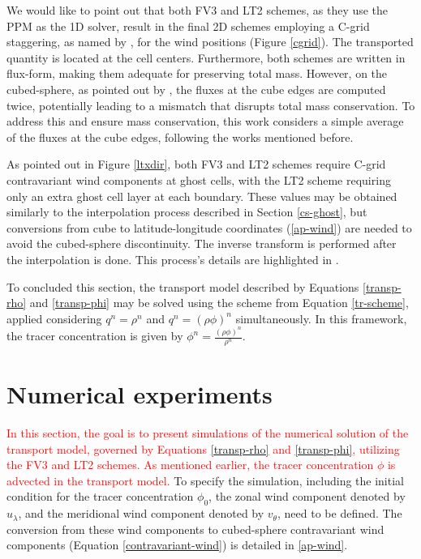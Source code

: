\documentclass[preprint,12pt]{elsarticle}
\begin{document}
\begin{linenumbers}
We would like to point out that both FV3 and LT2 schemes, as they use the PPM as the 1D solver, result in the final 2D schemes employing a C-grid staggering, as named by \cite{arakawa:1977}, for the wind positions (Figure \ref{cgrid}). 
The transported quantity is located at the cell centers.
Furthermore, both schemes are written in flux-form, making them adequate for preserving total mass. 
However, on the cubed-sphere, as pointed out by \cite{ross:2006,chen:2021,mouallem:2023}, the fluxes at the cube edges are computed twice, potentially leading to a mismatch that disrupts total mass conservation. 
To address this and ensure mass conservation, this work considers a simple average of the fluxes at the cube edges, following the works mentioned before.

As pointed out in Figure \ref{ltxdir}, both FV3 and LT2 schemes require C-grid contravariant wind components at ghost cells, with the LT2 scheme requiring only an extra ghost cell layer at each boundary.
These values may be obtained similarly to the interpolation process described in Section \ref{cs-ghost}, but conversions from cube to latitude-longitude coordinates (\ref{ap-wind}) are needed to avoid the cubed-sphere discontinuity. The inverse transform is performed after the interpolation is done.
This process's details are highlighted in \cite[Section 2.3]{mouallem:2023}.

To concluded this section, the transport model described by Equations \eqref{transp-rho} and \eqref{transp-phi} may be solved using the scheme from Equation \eqref{tr-scheme}, applied considering $q^n=\rho^n$ and $q^n=(\rho \phi)^n$ simultaneously.
In this framework, the tracer concentration is given by $\phi^n = \frac{(\rho \phi)^n}{\rho^n}$.

\section{Numerical experiments}
\label{num-exp}
\textcolor{red}{
In this section, the goal is to present simulations of the numerical solution of the transport model, governed by Equations \eqref{transp-rho} and \eqref{transp-phi}, utilizing the FV3 and LT2 schemes. As mentioned earlier, the tracer concentration $\phi$ is advected in the transport model.}
To specify the simulation, including the initial condition for the tracer concentration $\phi_0$, the zonal wind component  denoted by $u_\lambda$, and the meridional wind component denoted by $v_\theta$, need to be defined.
The conversion from these wind components to cubed-sphere contravariant wind components (Equation \eqref{contravariant-wind}) is detailed in \ref{ap-wind}.


\end{linenumbers}
\end{document}
